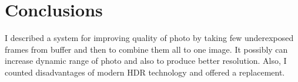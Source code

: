\documentclass[10pt,twoside,english,a4paper]{article}
\begin{document}
\section{Conclusions} \label{zaver} %
I described a system for improving quality of photo by 
taking few underexposed frames from buffer and then to combine them all to 
one image. It possibly can increase dynamic range of photo and also 
to produce better resolution. Also, I counted disadvantages of modern HDR 
technology and offered a replacement. 	

\cite{HDR2}






\end{document}
